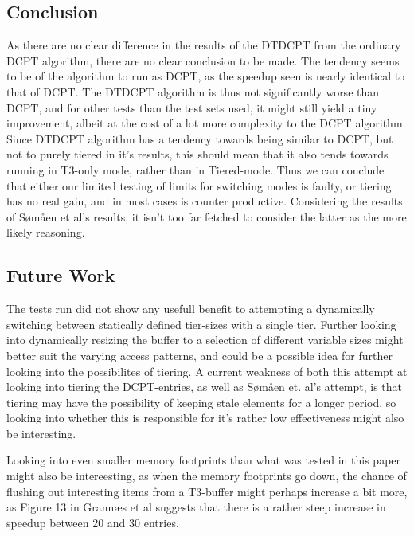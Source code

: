 \subsection{Conclusion}
As there are no clear difference in the results of the DTDCPT from the ordinary
DCPT algorithm, there are no clear conclusion to be made. The tendency seems to
be of the algorithm to run as DCPT, as the speedup seen is nearly identical to
that of DCPT. The DTDCPT algorithm is thus not significantly worse than DCPT, and for other
tests than the test sets used, it might still yield a tiny improvement, albeit at the cost
of a lot more complexity to the DCPT algorithm. Since DTDCPT algorithm has a tendency towards
being similar to DCPT, but not to purely tiered in it's results, this should mean that it also
tends towards running in T3-only mode, rather than in Tiered-mode. Thus we can conclude that either
our limited testing of limits for switching modes is faulty, or tiering has no real gain, and in most
cases is counter productive. Considering the results of Sømåen et al's results, it isn't too far fetched
to consider the latter as the more likely reasoning.

\subsection{Future Work}
The tests run did not show any usefull benefit to attempting a dynamically switching
between statically defined tier-sizes with a single tier. Further looking into dynamically
resizing the buffer to a selection of different variable sizes might better suit the varying
access patterns, and could be a possible idea for further looking into the possibilites of tiering.
A current weakness of both this attempt at looking into tiering the DCPT-entries, as well as Sømåen
et. al's attempt, is that tiering may have the possibility of keeping stale elements for a longer period,
so looking into whether this is responsible for it's rather low effectiveness might also be interesting.

Looking into even smaller memory footprints than what was tested in this paper might also be intereesting,
as when the memory footprints go down, the chance of flushing out interesting items from a T3-buffer might
perhaps increase a bit more, as Figure 13 in Grannæs et al suggests that there is a rather steep increase in
speedup between 20 and 30 entries.
